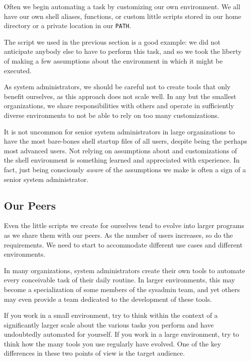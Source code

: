 Often we begin automating a task by customizing our
own environment.  We all have our own shell aliases,
functions, or custom little scripts stored in our home
directory or a private location in our {\tt PATH}.

The script we used in the previous section is a
good example:  we did not anticipate anybody else to
have to perform this task, and so we took the liberty
of making a few assumptions about the environment in
which it might be executed.

As system administrators, we should be careful not to
create tools that only benefit ourselves, as this
approach does not scale well.  In any but the smallest
organizations, we share responsibilities with others
and operate in sufficiently diverse environments to
not be able to rely on too many customizations.

It is not uncommon for senior system administrators in
large organizations to have the most bare-bones shell
startup files of all users, despite being the perhaps
most advanced users.  Not relying on assumptions about
and customizations of the shell environment is
something learned and appreciated with experience.  In
fact, just being consciously {\em aware} of the
assumptions we make is often a sign of a senior system
administrator.

\subsection{Our Peers}
\label{automation:who-benefits:peers}

Even the little scripts we create for ourselves tend
to evolve into larger programs as we share them with
our peers.  As the number of users increases, so do
the requirements.  We need to start to accommodate
different use cases and different environments.

In many organizations, system administrators create
their own tools to automate every conceivable task of
their daily routine.  In larger environments, this may
become a specialization of some members of the
sysadmin team, and yet others may even provide a team
dedicated to the development of these tools.

If you work in a small environment, try to think
within the context of a significantly larger scale
about the various tasks you perform and have
undoubtedly automated for yourself.  If you work in a
large environment, try to think how the many tools you
use regularly have evolved.  One of the key
differences in these two points of view is the target
audience.


